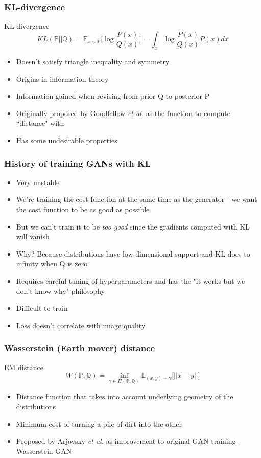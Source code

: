 \documentclass{beamer}
\begin{document}
\begin{frame}
	\frametitle{KL-divergence}
	\begin{exampleblock}{KL-divergence}
	\[
		KL(\mathbb{P} \vert \vert \mathbb{Q}) = \mathbb{E}_{x \sim \mathbb{P}} \Big[ \log \frac{P(x)}{Q(x)} \Big] = \int_{x} \log \frac{P(x)}{Q(x)} P(x) dx
	\]
\end{exampleblock}
	\begin{itemize}
		\item Doesn't satisfy triangle inequality and symmetry
		\item Origins in information theory
		\item Information gained when revising from prior Q to posterior P
		\item Originally proposed by Goodfellow \textit{et al.} as the function to compute ``distance" with
		\item Has some undesirable properties
	\end{itemize}
\end{frame}

\begin{frame}
	\frametitle{History of training GANs with KL}
	\begin{itemize}
		\item Very unstable
		\item We're training the cost function at the same time as the generator - we want the cost function to be as good as possible
		\item But we can't train it to be \textit{too good} since the gradients computed with KL will vanish
		\item Why? Because distributions have low dimensional support and KL does to infinity when Q is zero
		\item Requires careful tuning of hyperparameters and has the "it works but we don't know why" philosophy
		\item Difficult to train
		\item Loss doesn't correlate with image quality
	\end{itemize}
\end{frame}

\begin{frame}
	\frametitle{Wasserstein (Earth mover) distance}
	\begin{exampleblock}{EM distance}
	\[
		W(\mathbb{P}, \mathbb{Q}) = \inf_{\gamma \in \Pi(\mathbb{P}, \mathbb{Q})} {\mathbb{E}_{(x, y) \sim \gamma}} \big[ \lvert \lvert x - y \lvert \lvert \big]
	\]
\end{exampleblock}
	\begin{itemize}
		\item Distance function that takes into account underlying geometry of the distributions
		\item Minimum cost of turning a pile of dirt into the other
		\item Proposed by Arjovsky \textit{et al.} as improvement to original GAN training - Wasserstein GAN
	\end{itemize}
\end{frame}
\end{document}
